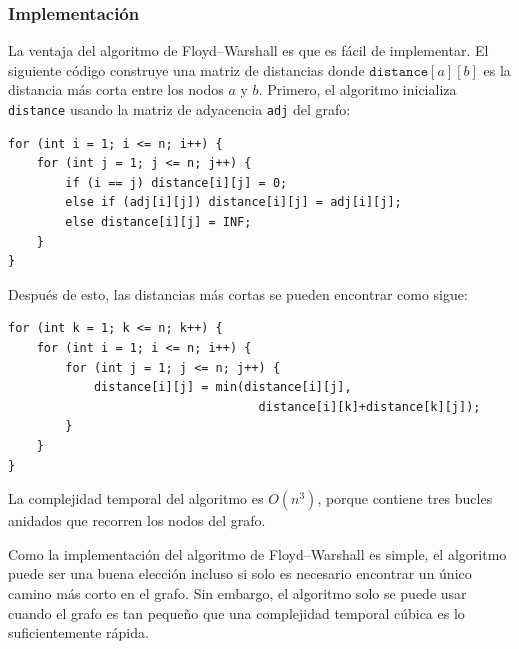 \subsubsection{Implementación}

La ventaja del
algoritmo de Floyd–Warshall es que es
fácil de implementar.
El siguiente código construye una
matriz de distancias donde $\texttt{distance}[a][b]$
es la distancia más corta entre los nodos $a$ y $b$.
Primero, el algoritmo inicializa \texttt{distance}
usando la matriz de adyacencia \texttt{adj} del grafo:

\begin{lstlisting}
for (int i = 1; i <= n; i++) {
    for (int j = 1; j <= n; j++) {
        if (i == j) distance[i][j] = 0;
        else if (adj[i][j]) distance[i][j] = adj[i][j];
        else distance[i][j] = INF;
    }
}
\end{lstlisting}
Después de esto, las distancias más cortas se pueden encontrar como sigue:
\begin{lstlisting}
for (int k = 1; k <= n; k++) {
    for (int i = 1; i <= n; i++) {
        for (int j = 1; j <= n; j++) {
            distance[i][j] = min(distance[i][j],
                                   distance[i][k]+distance[k][j]);
        }
    }
}
\end{lstlisting}

La complejidad temporal del algoritmo es $O(n^3)$,
porque contiene tres bucles anidados
que recorren los nodos del grafo.

Como la implementación del algoritmo de Floyd–Warshall
es simple, el algoritmo puede ser
una buena elección incluso si solo es necesario encontrar un
único camino más corto en el grafo.
Sin embargo, el algoritmo solo se puede usar cuando el grafo
es tan pequeño que una complejidad temporal cúbica es lo suficientemente rápida.
